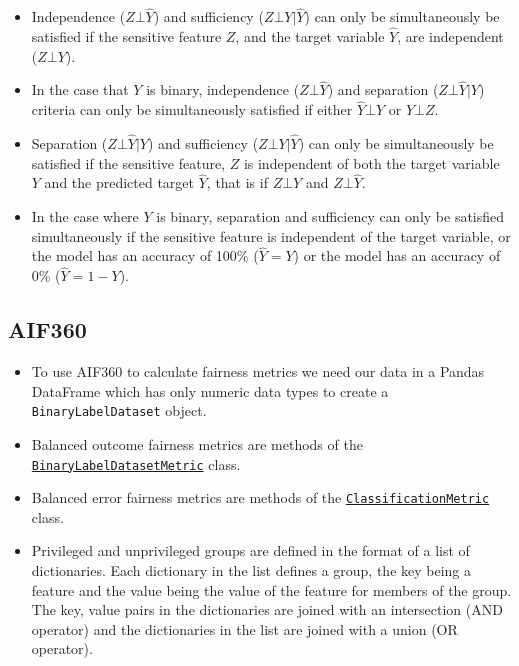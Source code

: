 \begin{itemize}[leftmargin=*]
\item Independence ($Z \bot \hat{Y}$) and sufficiency ($Z \bot Y | \hat{Y}$) can only be simultaneously be satisfied if the sensitive feature $Z$, and the target variable $\hat{Y}$, are independent ($Z \bot Y$).
%
\item In the case that $Y$ is binary, independence ($Z \bot \hat{Y}$) and separation ($Z \bot \hat{Y} | Y$) criteria can only be simultaneously satisfied if either $\hat{Y} \bot Y$ or $Y \bot Z$.
%
\item Separation ($Z \bot \hat{Y} | Y$) and sufficiency ($Z \bot Y | \hat{Y}$) can only be simultaneously be satisfied if the sensitive feature, $Z$ is independent of both the target variable $Y$ and the predicted target $\hat{Y}$, that is if $Z \bot Y$ and $Z \bot \hat{Y}$.
%
\item In the case where $Y$ is binary, separation and sufficiency can only be satisfied simultaneously if the sensitive feature is independent of the target variable, or the model has an accuracy of 100\% ($\hat{Y}=Y$) or the model has an accuracy of 0\% ($\hat{Y}=1-Y$).
\end{itemize}

\subsection*{AIF360}

\begin{itemize}[leftmargin=*]
\item To use AIF360 to calculate fairness metrics we need our data in a Pandas DataFrame which has only numeric data types to create a \texttt{BinaryLabelDataset} object.
%
\item Balanced outcome fairness metrics are methods of the \href{https://aif360.readthedocs.io/en/latest/modules/generated/aif360.metrics.BinaryLabelDatasetMetric.html#aif360.metrics.BinaryLabelDatasetMetric}{\texttt{BinaryLabelDatasetMetric}} class.
%
\item Balanced error fairness metrics are methods of the \href{https://aif360.readthedocs.io/en/latest/modules/generated/aif360.metrics.ClassificationMetric.html#}{\texttt{ClassificationMetric}} class.
%
\item Privileged and unprivileged groups are defined in the format of a list of dictionaries. Each dictionary in the list defines a group, the key being a feature and the value being the value of the feature for members of the group. The key, value pairs in the dictionaries are joined with an intersection (AND operator) and the dictionaries in the list are joined with a union (OR operator).
\end{itemize}


